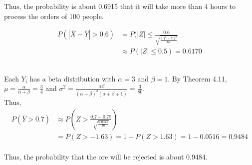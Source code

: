 \documentclass[12pt]{article}
\newenvironment{problem}[2][Problem]{\begin{trivlist}
\item[\hskip \labelsep {\bfseries #1}\hskip \labelsep {\bfseries #2.}]}{\end{trivlist}}
\begin{document}
Thus, the probability is about 0.6915 that it will take more than 4 hours to process the orders of 100 people.

\begin{problem}{7.92}
\end{problem}

\begin{align*}
P(|\overline{X} - \overline{Y}| > 0.6) &= P(|Z| \leq \frac{0.6}{\sqrt{\frac{6.4^2 + 7.2^2}{64}}}\\
	&\approx P(|Z| \leq 0.5) = 0.6170
\end{align*}\\

\begin{problem}{7.96}
\end{problem}

Each $Y_i$ has a beta distribution with $\alpha = 3$ and $\beta = 1$. By Theorem 4.11, $\mu = \frac{\alpha}{\alpha + \beta} = \frac{3}{4}$ and $\sigma^2 = \frac{\alpha\beta}{(\alpha + \beta)^2(\alpha + \beta + 1)} = \frac{3}{80}$.\\
Thus,\\
\begin{align*}
P(\overline{Y} > 0.7) &\approx P(Z > \frac{0.7 - 0.75}{\sqrt{\frac{0.0375}{40}}})\\
	&= P(Z > -1.63) = 1 - P(Z > 1.63) = 1 - 0.0516 = 0.9484
\end{align*}\\
Thus, the probability that the ore will be rejected is about 0.9484.
\end{document}

